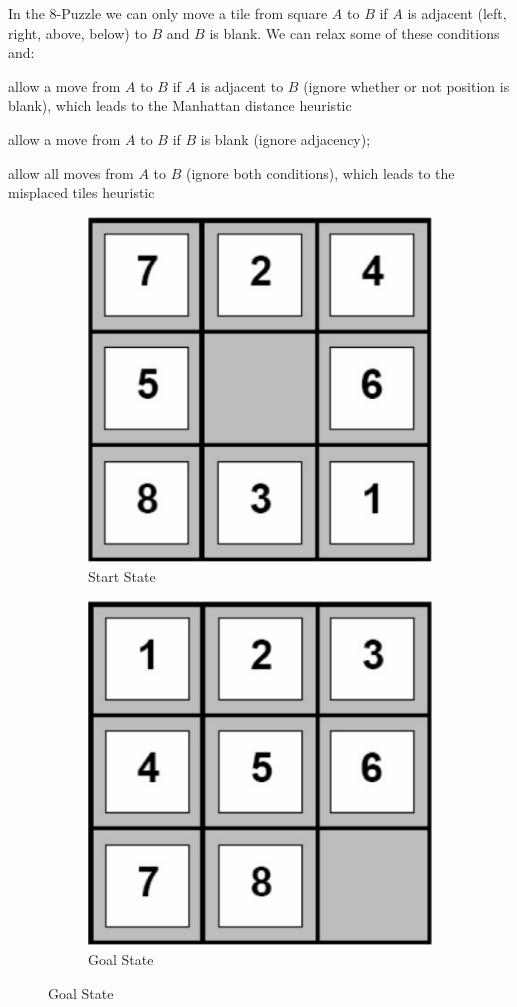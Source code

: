 \begin{example}
    In the 8-Puzzle we can only move a tile from square $A$ to $B$ if $A$ is adjacent (left, right, above, below) to $B$ and $B$ is blank. We can relax some of these conditions and:

    \begin{listo}
        \item allow a move from $A$ to $B$ if $A$ is adjacent to $B$ (ignore whether or not position is blank), which leads to the Manhattan distance heuristic
        
        \item allow a move from $A$ to $B$ if $B$ is blank (ignore adjacency);
        
        \item allow all moves from $A$ to $B$ (ignore both conditions), which leads to the misplaced tiles heuristic
    \end{listo}

    \begin{figure}[ht!]
        \centering

        \begin{subfigure}[t]{0.45\linewidth}
            \centering
            \includegraphics*[width=0.45\linewidth]{figures/8-puzzle-start.png}
            \caption*{Start State}
        \end{subfigure}
        \hfil%
        \begin{subfigure}[t]{0.45\linewidth}
            \centering
            \includegraphics*[width=0.45\linewidth]{figures/8-puzzle-goal.png}
            \caption*{Goal State}
        \end{subfigure}
    \end{figure}


\end{example}
